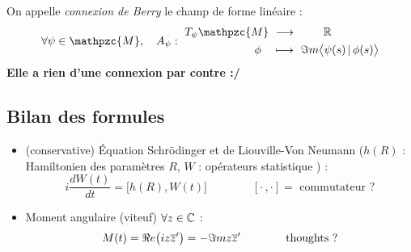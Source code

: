 \begin{definition}\label{def:berry_connx}
	On appelle \emph{connexion de Berry} le champ de forme linéaire :
	\begin{equation}\label{eq:berry_connx}
		\forall \psi\in\mathpzc{M},\quad A_\psi :\ \begin{aligned} T_\psi\mathpzc{M}\ &\lr\qquad\ \R \\ \phi\quad &\longmapsto\ \Im m \big\langle \psi(s) \, |\, \phi(s) \big\rangle
		\end{aligned}
	\end{equation}
	\textbf{Elle a rien d'une connexion par contre :/}
\end{definition}



\subsection{Bilan des formules}

\begin{itemize}	
	\item (conservative) Équation Schrödinger et de Liouville-Von Neumann ($h(R)$ : Hamiltonien des paramètres $R$, $W$ : opérateurs statistique ) \cite[p.6]{bohm_geometric_2003} :
	\begin{equation}\label{eq:liouville-neumann}
		i\frac{d W(t)}{dt} = \big[h(R),W(t)\big] \qquad\qquad [\cdot\,,\cdot]=\text{ commutateur ?}
	\end{equation}
	
	\item Moment angulaire (viteuf) $\forall z\in\mathbb{C}$ :
	\begin{equation}\label{eq:mom_angu}
		M(t) = \Re e \big(iz\overline{z}'\big) = -\Im m z\overline{z}'  \qquad\qquad \text{thoughts ?}
	\end{equation}
	
\end{itemize}
